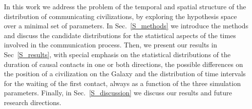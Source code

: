 
In this work we address the problem of the temporal and spatial
structure of the distribution of communicating civilizations, by
exploring the hypothesis space over a minimal set of parameters.
%
In Sec.~\ref{S_methods} we introduce the methods and discuss the
candidate distributions for the statistical aspects of the times
involved in the communication process.
%
Then, we present our results in Sec~\ref{S_results}, with special
emphasis on the statistical distributions of the duration of causal
contacts in one or both directions, the possible differences on the
position of a civilization on the Galaxy and the distribution of time
intervals for the waiting of the first contact, always as a function
of the three simulation parameters.
%
Finally, in Sec.~\ref{S_discussion} we discuss our results and future
research directions.




